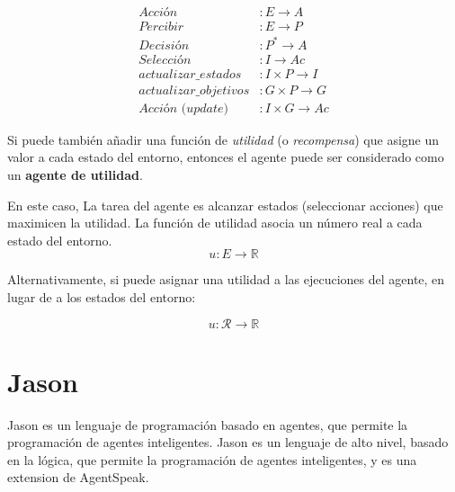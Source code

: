 \begin{align}
   \textit{Acción} & : E \rightarrow A \\
   \textit{Percibir} & : E \rightarrow P\\
   \textit{Decisión} & : P^* \rightarrow A\\
   \textit{Selección} & : I \rightarrow Ac \\
   \textit{actualizar\_estados} & : I \times P \rightarrow I\\
   \textit{actualizar\_objetivos} & : G \times P \rightarrow G \\
   \textit{Acción (update)} & : I \times G \rightarrow Ac
\end{align}

Si puede también añadir una función de \textit{utilidad} (o \textit{recompensa}) que asigne un valor a cada estado del entorno, entonces el agente puede ser considerado como un \textbf{agente de utilidad}.

En este caso, La tarea del agente es alcanzar estados (seleccionar acciones) que maximicen la utilidad. La función de utilidad asocia un número real a cada estado del entorno. 
\begin{equation}
   u : E \rightarrow \mathbb{R}
\end{equation}

Alternativamente, si puede asignar una utilidad a las ejecuciones del agente, en lugar de a los estados del entorno:

\begin{equation}
   u : \mathcal{R} \rightarrow \mathbb{R}
\end{equation}

\section{Jason}

Jason es un lenguaje de programación basado en agentes, que permite la programación de agentes inteligentes. Jason es un lenguaje de alto nivel, basado en la lógica, que permite la programación de agentes inteligentes, y es una extension de AgentSpeak.

